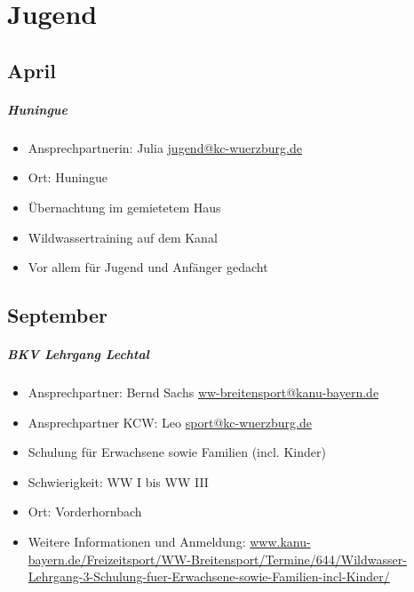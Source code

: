 \documentclass[12pt, a4paper]{report}
\begin{document}
\chapter*{Jugend}
\thispagestyle{Jugend}
\pagestyle{Jugend}
\section*{April}\paragraph{Huningue}
\begin{itemize}
    \item Ansprechpartnerin: Julia \href{mailto:jugend@kc-wuerzburg.de}{jugend@kc-wuerzburg.de}
    \item Ort: Huningue
    \item Übernachtung im gemietetem Haus
    \item Wildwassertraining auf dem Kanal
    \item Vor allem für Jugend und Anfänger gedacht
\end{itemize}

\section*{September}\paragraph{BKV Lehrgang Lechtal}
\begin{itemize}
    \item Ansprechpartner: Bernd Sachs \href{mailto:ww-breitensport@kanu-bayern.de}{ww-breitensport@kanu-bayern.de}
    \item Ansprechpartner KCW: Leo \href{mailto:sport@kc-wuerzburg.de}{sport@kc-wuerzburg.de}
    \item Schulung für Erwachsene sowie Familien (incl. Kinder)
    \item Schwierigkeit: WW I bis WW III
    \item Ort: Vorderhornbach
    \item Weitere Informationen und Anmeldung: \url{www.kanu-bayern.de/Freizeitsport/WW-Breitensport/Termine/644/Wildwasser-Lehrgang-3-Schulung-fuer-Erwachsene-sowie-Familien-incl-Kinder/}
\end{itemize}
\end{document}
